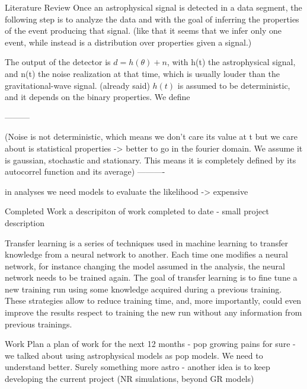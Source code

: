 \documentclass[a4paper, 12pt, twoside, openright, titlepage]{book}
\begin{document}
\begin{chapter}{Literature Review}
Once an astrophysical signal is detected in a data segment, the following step is to analyze the data and with the goal of inferring the properties of the event producing that signal. (like that it seems that we infer only one event, while instead is a distribution over properties given a signal.)



The output of the detector is $d=h(\theta)+n$, with h(t) the astrophysical signal, 
and n(t) the noise realization at that time, which is usually louder than the gravitational-wave signal. (already said)
$h(t)$ is assumed to be deterministic, and it depends on the binary properties.
We define  



---------

(Noise is not deterministic, which means we don't care its value at t but we care about is statistical properties -> better to go in the fourier domain. We assume it is gaussian, stochastic and stationary. This means it is completely defined by its autocorrel function and its average)
----------

in analyses we need models to evaluate the likelihood -> expensive





\end{chapter}

\begin{chapter}{Completed Work}
a descripiton of work completed to date
- small project description

Transfer learning is a series of techniques used in machine learning to transfer knowledge from a neural network to another.
Each time one modifies a neural network, for instance changing the model assumed in the analysis, the neural network needs to be trained again. 
The goal of transfer learning is to fine tune a new training run using some knowledge acquired during a previous training.
These strategies allow to reduce training time, and, more importantly, could even improve the results respect to training the new run without any information from previous trainings. 




\end{chapter}

\begin{chapter}{Work Plan}
a plan of work for the next 12 months
- pop growing pains for sure
- we talked about using astrophysical models as pop models. We need to understand better. Surely something more astro
- another idea is to keep developing the current project (NR simulations, beyond GR models)
\end{chapter}
\end{document}
